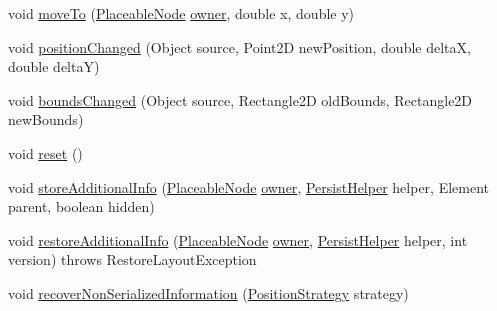 \begin{DoxyCompactItemize}
\item 
void \hyperlink{classorg_1_1tzi_1_1use_1_1gui_1_1views_1_1diagrams_1_1elements_1_1positioning_1_1_statefull_position_strategy_aa8591f28a225f66dc60c37f169779121}{move\-To} (\hyperlink{classorg_1_1tzi_1_1use_1_1gui_1_1views_1_1diagrams_1_1elements_1_1_placeable_node}{Placeable\-Node} \hyperlink{classorg_1_1tzi_1_1use_1_1gui_1_1views_1_1diagrams_1_1elements_1_1positioning_1_1_statefull_position_strategy_ac987ea0c7e5b6ddc09cc5afb41043dfd}{owner}, double x, double y)
\item 
void \hyperlink{classorg_1_1tzi_1_1use_1_1gui_1_1views_1_1diagrams_1_1elements_1_1positioning_1_1_statefull_position_strategy_a54b37f46c8c7a36d89216138b31c9924}{position\-Changed} (Object source, Point2\-D new\-Position, double delta\-X, double delta\-Y)
\item 
void \hyperlink{classorg_1_1tzi_1_1use_1_1gui_1_1views_1_1diagrams_1_1elements_1_1positioning_1_1_statefull_position_strategy_aa995c3f039fc6da30fcfefc4dd9c60fa}{bounds\-Changed} (Object source, Rectangle2\-D old\-Bounds, Rectangle2\-D new\-Bounds)
\item 
void \hyperlink{classorg_1_1tzi_1_1use_1_1gui_1_1views_1_1diagrams_1_1elements_1_1positioning_1_1_statefull_position_strategy_a12a382645925bf78bea37a1871399885}{reset} ()
\item 
void \hyperlink{classorg_1_1tzi_1_1use_1_1gui_1_1views_1_1diagrams_1_1elements_1_1positioning_1_1_statefull_position_strategy_a475a879a4a51b34c89632545b8f9d2e3}{store\-Additional\-Info} (\hyperlink{classorg_1_1tzi_1_1use_1_1gui_1_1views_1_1diagrams_1_1elements_1_1_placeable_node}{Placeable\-Node} \hyperlink{classorg_1_1tzi_1_1use_1_1gui_1_1views_1_1diagrams_1_1elements_1_1positioning_1_1_statefull_position_strategy_ac987ea0c7e5b6ddc09cc5afb41043dfd}{owner}, \hyperlink{classorg_1_1tzi_1_1use_1_1gui_1_1util_1_1_persist_helper}{Persist\-Helper} helper, Element parent, boolean hidden)
\item 
void \hyperlink{classorg_1_1tzi_1_1use_1_1gui_1_1views_1_1diagrams_1_1elements_1_1positioning_1_1_statefull_position_strategy_abc8c2b8fc1394df129eecb946bab2701}{restore\-Additional\-Info} (\hyperlink{classorg_1_1tzi_1_1use_1_1gui_1_1views_1_1diagrams_1_1elements_1_1_placeable_node}{Placeable\-Node} \hyperlink{classorg_1_1tzi_1_1use_1_1gui_1_1views_1_1diagrams_1_1elements_1_1positioning_1_1_statefull_position_strategy_ac987ea0c7e5b6ddc09cc5afb41043dfd}{owner}, \hyperlink{classorg_1_1tzi_1_1use_1_1gui_1_1util_1_1_persist_helper}{Persist\-Helper} helper, int version)  throws Restore\-Layout\-Exception 
\item 
void \hyperlink{classorg_1_1tzi_1_1use_1_1gui_1_1views_1_1diagrams_1_1elements_1_1positioning_1_1_statefull_position_strategy_a5c6bd2b756cfc80487d404196dfcfcb5}{recover\-Non\-Serialized\-Information} (\hyperlink{interfaceorg_1_1tzi_1_1use_1_1gui_1_1views_1_1diagrams_1_1elements_1_1positioning_1_1_position_strategy}{Position\-Strategy} strategy)
\end{DoxyCompactItemize}
